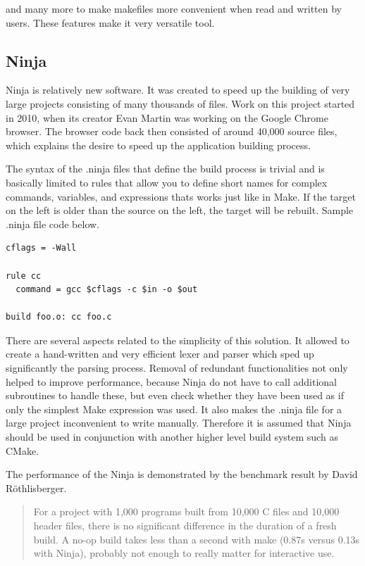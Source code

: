 and many more to make makefiles more convenient when read and written by
users. These features make it very versatile tool.

\hypertarget{ninja}{%
\subsection{Ninja}\label{ninja}}

Ninja is relatively new software. It was created to speed up the
building of very large projects consisting of many thousands of files.
Work on this project started in 2010, when its creator Evan Martin was
working on the Google Chrome browser. The browser code back then
consisted of around 40,000 source files, which explains the desire to
speed up the application building process.

The syntax of the .ninja files that define the build process is trivial
and is basically limited to rules that allow you to define short names
for complex commands, variables, and expressions thats works just like
in Make. If the target on the left is older than the source on the left,
the target will be rebuilt. Sample .ninja file code below.

\begin{verbatim}
cflags = -Wall

rule cc
  command = gcc $cflags -c $in -o $out

build foo.o: cc foo.c
\end{verbatim}

There are several aspects related to the simplicity of this solution. It
allowed to create a hand-written and very efficient lexer and parser
which sped up significantly the parsing process. Removal of redundant
functionalities not only helped to improve performance, because Ninja do
not have to call additional subroutines to handle these, but even check
whether they have been used as if only the simplest Make expression was
used. It also makes the .ninja file for a large project inconvenient to
write manually. Therefore it is assumed that Ninja should be used in
conjunction with another higher level build system such as CMake.

The performance of the Ninja is demonstrated by the benchmark result by
David Röthlisberger.

\begin{quote}
For a project with 1,000 programs built from 10,000 C files and 10,000
header files, there is no significant difference in the duration of a
fresh build. A no-op build takes less than a second with make (0.87s
versus 0.13s with Ninja), probably not enough to really matter for
interactive use.
\end{quote}

